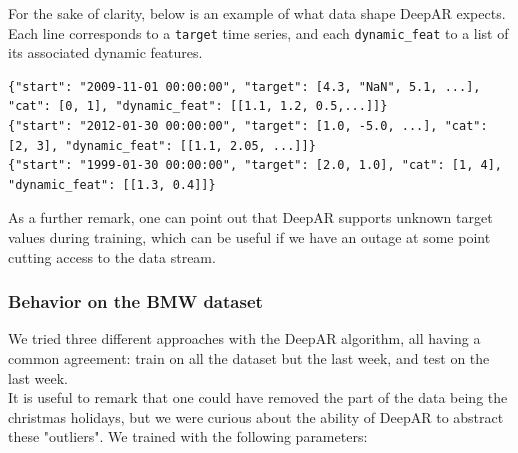 For the sake of clarity, below is an example of what data shape DeepAR expects. Each line corresponds to a \lstinline{target} time series,  and each \lstinline{dynamic_feat} to a list of its associated dynamic features.


\begin{lstlisting}
{"start": "2009-11-01 00:00:00", "target": [4.3, "NaN", 5.1, ...], "cat": [0, 1], "dynamic_feat": [[1.1, 1.2, 0.5,...]]}
{"start": "2012-01-30 00:00:00", "target": [1.0, -5.0, ...], "cat": [2, 3], "dynamic_feat": [[1.1, 2.05, ...]]}
{"start": "1999-01-30 00:00:00", "target": [2.0, 1.0], "cat": [1, 4], "dynamic_feat": [[1.3, 0.4]]}
\end{lstlisting}

As a further remark, one can point out that DeepAR supports unknown target values during training, which can be useful if we have an outage at some point cutting access to the data stream.

\subsubsection{Behavior on the BMW dataset}

We tried three different approaches with the DeepAR algorithm, all having a common agreement: train on all the dataset but the last week, and test on the last week. \\
It is useful to remark that one could have removed the part of the data being the christmas holidays, but we were curious about the ability of DeepAR to abstract these "outliers". We trained with the following parameters:

